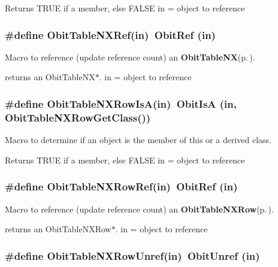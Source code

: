 Returns TRUE if a member, else FALSE in = object to reference 
\subsubsection{\setlength{\rightskip}{0pt plus 5cm}\#define Obit\-Table\-NXRef(in)\ Obit\-Ref (in)}\label{ObitTableNX_8h_a2}


Macro to reference (update reference count) an {\bf Obit\-Table\-NX}{\rm (p.\,\pageref{structObitTableNX})}. 

returns an Obit\-Table\-NX$\ast$. in = object to reference 
\subsubsection{\setlength{\rightskip}{0pt plus 5cm}\#define Obit\-Table\-NXRow\-Is\-A(in)\ Obit\-Is\-A (in, Obit\-Table\-NXRow\-Get\-Class())}\label{ObitTableNX_8h_a6}


Macro to determine if an object is the member of this or a derived class. 

Returns TRUE if a member, else FALSE in = object to reference 
\subsubsection{\setlength{\rightskip}{0pt plus 5cm}\#define Obit\-Table\-NXRow\-Ref(in)\ Obit\-Ref (in)}\label{ObitTableNX_8h_a5}


Macro to reference (update reference count) an {\bf Obit\-Table\-NXRow}{\rm (p.\,\pageref{structObitTableNXRow})}. 

returns an Obit\-Table\-NXRow$\ast$. in = object to reference 
\subsubsection{\setlength{\rightskip}{0pt plus 5cm}\#define Obit\-Table\-NXRow\-Unref(in)\ Obit\-Unref (in)}\label{ObitTableNX_8h_a4}


